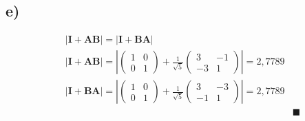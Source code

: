 \subsection*{e) }
\begin{align*}
	&\left|\mathbf{I+AB}\right|=\left|\mathbf{I+BA}\right|& \\
	&\left|\mathbf{I+AB}\right|=\left|
	\begin{pmatrix}
	1 & 0 \\
	0 & 1
	\end{pmatrix}+\frac{1}{\sqrt{5}}
	\begin{pmatrix}
	3 & -1 \\
	-3 & 1
	\end{pmatrix}\right|=2,7789& \\
	&\left|\mathbf{I+BA}\right|=\left|
	\begin{pmatrix}
	1 & 0 \\
	0 & 1
	\end{pmatrix}+\frac{1}{\sqrt{5}}
	\begin{pmatrix}
	3 & -3 \\
	-1 & 1
	\end{pmatrix}\right|=2,7789& \\
	&&\blacksquare
\end{align*}

